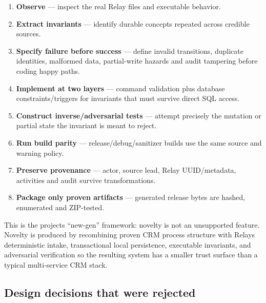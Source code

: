 \documentclass[
]{article}
\providecommand{\tightlist}{%
  \setlength{\itemsep}{0pt}\setlength{\parskip}{0pt}}
\begin{document}
\begin{enumerate}
\def\labelenumi{\arabic{enumi}.}
\tightlist
\item
  \textbf{Observe} --- inspect the real Relay files and executable
  behavior.
\item
  \textbf{Extract invariants} --- identify durable concepts repeated
  across credible sources.
\item
  \textbf{Specify failure before success} --- define invalid
  transitions, duplicate identities, malformed data, partial-write
  hazards and audit tampering before coding happy paths.
\item
  \textbf{Implement at two layers} --- command validation plus database
  constraints/triggers for invariants that must survive direct SQL
  access.
\item
  \textbf{Construct inverse/adversarial tests} --- attempt precisely the
  mutation or partial state the invariant is meant to reject.
\item
  \textbf{Run build parity} --- release/debug/sanitizer builds use the
  same source and warning policy.
\item
  \textbf{Preserve provenance} --- actor, source lead, Relay
  UUID/metadata, activities and audit survive transformations.
\item
  \textbf{Package only proven artifacts} --- generated release bytes are
  hashed, enumerated and ZIP-tested.
\end{enumerate}

This is the project\textquotesingle s ``new-gen'' framework: novelty is
not an unsupported feature. Novelty is produced by recombining proven
CRM process structure with Relay\textquotesingle s deterministic intake,
transactional local persistence, executable invariants, and adversarial
verification so the resulting system has a smaller trust surface than a
typical multi-service CRM stack.

\subsection{Design decisions that were
rejected}\label{design-decisions-that-were-rejected}
\end{document}
